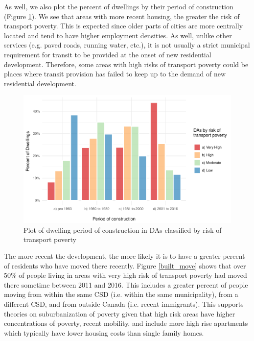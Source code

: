 \documentclass[11 pt, letterpaper]{article}
\begin{document}
{As well, we also plot the percent of dwellings by their period of construction (Figure \ref{built_period}). We see that areas with more recent housing, the greater the risk of transport poverty. This is expected since older parts of cities are more centrally located and tend to have higher employment densities. As well, unlike other services (e.g. paved roads, running water, etc.), it is not usually a strict municipal requirement for transit to be provided at the onset of new residential development. Therefore, some areas with high risks of transport poverty could be places where transit provision has failed to keep up to the demand of new residential development.

\begin{figure}[H]
	\caption{Plot of dwelling period of construction in DAs classified by risk of transport poverty} 
	\label{built_period}
	\centerline{\includegraphics[width=6.5in]{figures/built_env/built_period.pdf}}
	\vspace{2mm}
\end{figure}

The more recent the development, the more likely it is to have a greater percent of residents who have moved there recently. Figure \ref{built_move} shows that over 50\% of people living in areas with very high risk of transport poverty had moved there sometime between 2011 and 2016. This includes a greater percent of people moving from within the same CSD (i.e. within the same municipality), from a different CSD, and from outside Canada (i.e. recent immigrants). This supports theories on suburbanization of poverty given that high risk areas have higher concentrations of poverty, recent mobility, and include more high rise apartments which typically have lower housing costs than single family homes.

}
\end{document}
